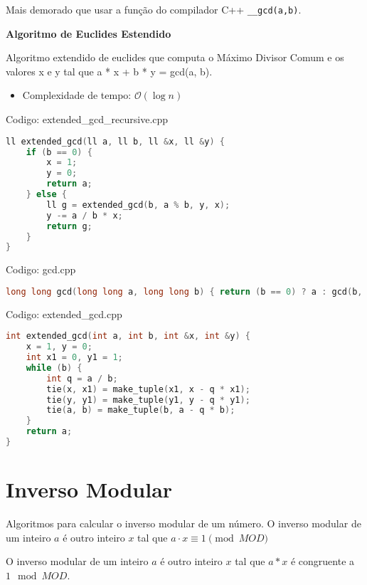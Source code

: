 \documentclass[10pt, a4paper, oneside]{book}
\begin{document}
Mais demorado que usar a função do compilador C++ \texttt{\_\_gcd(a,b)}.



\textbf{Algoritmo de Euclides Estendido} 



Algoritmo extendido de euclides que computa o Máximo Divisor Comum e os valores x e y tal que a * x + b * y = gcd(a, b).



\begin{itemize}
\item Complexidade de tempo: $\mathcal{O}(\log n)$
\end{itemize}

\hfill

Codigo: extended\_gcd\_recursive.cpp

\begin{lstlisting}[language=C++]
ll extended_gcd(ll a, ll b, ll &x, ll &y) {
    if (b == 0) {
        x = 1;
        y = 0;
        return a;
    } else {
        ll g = extended_gcd(b, a % b, y, x);
        y -= a / b * x;
        return g;
    }
}
\end{lstlisting}
\hfill

Codigo: gcd.cpp

\begin{lstlisting}[language=C++]
long long gcd(long long a, long long b) { return (b == 0) ? a : gcd(b, a % b); }
\end{lstlisting}
\hfill

Codigo: extended\_gcd.cpp

\begin{lstlisting}[language=C++]
int extended_gcd(int a, int b, int &x, int &y) {
    x = 1, y = 0;
    int x1 = 0, y1 = 1;
    while (b) {
        int q = a / b;
        tie(x, x1) = make_tuple(x1, x - q * x1);
        tie(y, y1) = make_tuple(y1, y - q * y1);
        tie(a, b) = make_tuple(b, a - q * b);
    }
    return a;
}
\end{lstlisting}
\hfill

\section{Inverso Modular}


Algoritmos para calcular o inverso modular de um número. O inverso modular de um inteiro $a$ é outro inteiro $x$ tal que $a \cdot x \equiv 1 \pmod{MOD}$



O inverso modular de um inteiro $a$ é outro inteiro $x$ tal que $a * x$ é congruente a $1 \mod MOD$.
\end{document}
